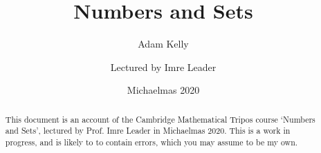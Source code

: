 \documentclass[a4]{scrartcl}
\title{Numbers and Sets}
\subtitle{Adam Kelly}
\author{Lectured by Imre Leader}
\date{Michaelmas 2020}
\begin{document}
\maketitle

\begin{abstract}
	This document is an account of the Cambridge Mathematical Tripos course `Numbers and Sets', lectured by Prof. Imre Leader in Michaelmas 2020.
	This is a work in progress, and is likely to to contain errors, which you may assume to be my own.
\end{abstract}









\end{document}
